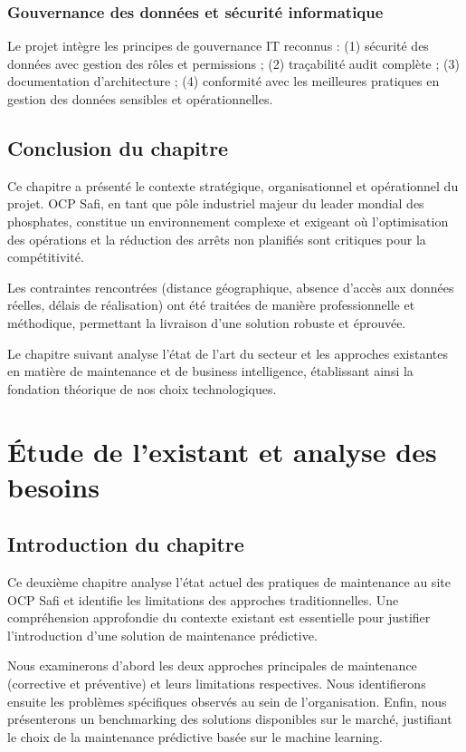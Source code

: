 \documentclass[a4paper,12pt,twoside]{report}
\begin{document}
\subsection{Gouvernance des données et sécurité informatique}

Le projet intègre les principes de gouvernance IT reconnus : (1) sécurité des données avec gestion des rôles et permissions ; (2) traçabilité audit complète ; (3) documentation d'architecture ; (4) conformité avec les meilleures pratiques en gestion des données sensibles et opérationnelles.

\section*{Conclusion du chapitre}

Ce chapitre a présenté le contexte stratégique, organisationnel et opérationnel du projet. OCP Safi, en tant que pôle industriel majeur du leader mondial des phosphates, constitue un environnement complexe et exigeant où l'optimisation des opérations et la réduction des arrêts non planifiés sont critiques pour la compétitivité.

Les contraintes rencontrées (distance géographique, absence d'accès aux données réelles, délais de réalisation) ont été traitées de manière professionnelle et méthodique, permettant la livraison d'une solution robuste et éprouvée.

Le chapitre suivant analyse l'état de l'art du secteur et les approches existantes en matière de maintenance et de business intelligence, établissant ainsi la fondation théorique de nos choix technologiques.

\chapter{Étude de l'existant et analyse des besoins}

\section*{Introduction du chapitre}

Ce deuxième chapitre analyse l'état actuel des pratiques de maintenance au site OCP Safi et identifie les limitations des approches traditionnelles. Une compréhension approfondie du contexte existant est essentielle pour justifier l'introduction d'une solution de maintenance prédictive.

Nous examinerons d'abord les deux approches principales de maintenance (corrective et préventive) et leurs limitations respectives. Nous identifierons ensuite les problèmes spécifiques observés au sein de l'organisation. Enfin, nous présenterons un benchmarking des solutions disponibles sur le marché, justifiant le choix de la maintenance prédictive basée sur le machine learning.
\end{document}
